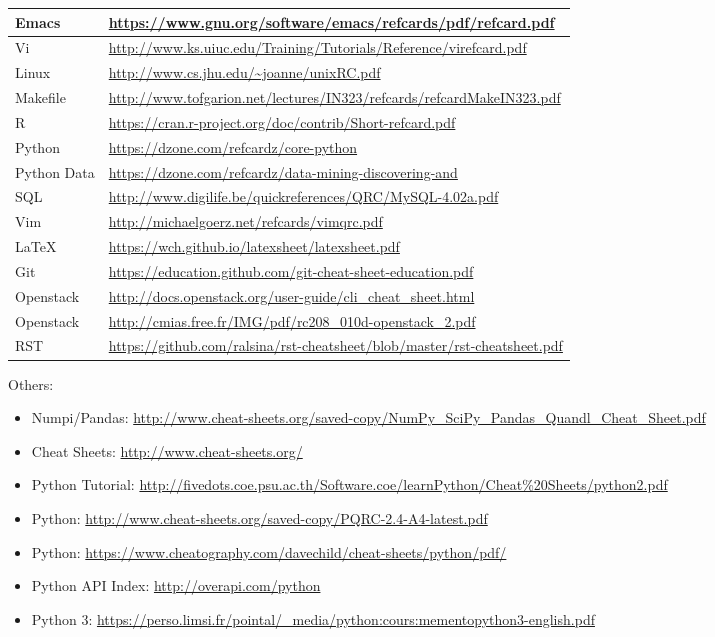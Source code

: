 \noindent\begin{tabulary}{\linewidth}{|L|L|}
\hline

Emacs
&
\url{https://www.gnu.org/software/emacs/refcards/pdf/refcard.pdf}
\\
\hline
Vi
&
\url{http://www.ks.uiuc.edu/Training/Tutorials/Reference/virefcard.pdf}
\\
\hline
Linux
&
\url{http://www.cs.jhu.edu/~joanne/unixRC.pdf}
\\
\hline
Makefile
&
\url{http://www.tofgarion.net/lectures/IN323/refcards/refcardMakeIN323.pdf}
\\
\hline
R
&
\url{https://cran.r-project.org/doc/contrib/Short-refcard.pdf}
\\
\hline
Python
&
\url{https://dzone.com/refcardz/core-python}
\\
\hline
Python Data
&
\url{https://dzone.com/refcardz/data-mining-discovering-and}
\\
\hline
SQL
&
\url{http://www.digilife.be/quickreferences/QRC/MySQL-4.02a.pdf}
\\
\hline
Vim
&
\url{http://michaelgoerz.net/refcards/vimqrc.pdf}
\\
\hline
LaTeX
&
\url{https://wch.github.io/latexsheet/latexsheet.pdf}
\\
\hline
Git
&
\url{https://education.github.com/git-cheat-sheet-education.pdf}
\\
\hline
Openstack
&
\url{http://docs.openstack.org/user-guide/cli\_cheat\_sheet.html}
\\
\hline
Openstack
&
\url{http://cmias.free.fr/IMG/pdf/rc208\_010d-openstack\_2.pdf}
\\
\hline
RST
&
\url{https://github.com/ralsina/rst-cheatsheet/blob/master/rst-cheatsheet.pdf}
\\
\hline\end{tabulary}


Others:
\begin{itemize}
\item {} 
Numpi/Pandas: \url{http://www.cheat-sheets.org/saved-copy/NumPy\_SciPy\_Pandas\_Quandl\_Cheat\_Sheet.pdf}

\item {} 
Cheat Sheets: \url{http://www.cheat-sheets.org/}

\item {} 
Python Tutorial: \url{http://fivedots.coe.psu.ac.th/Software.coe/learnPython/Cheat\%20Sheets/python2.pdf}

\item {} 
Python: \url{http://www.cheat-sheets.org/saved-copy/PQRC-2.4-A4-latest.pdf}

\item {} 
Python: \url{https://www.cheatography.com/davechild/cheat-sheets/python/pdf/}

\item {} 
Python API Index: \url{http://overapi.com/python}

\item {} 
Python 3: \url{https://perso.limsi.fr/pointal/\_media/python:cours:mementopython3-english.pdf}

\end{itemize}



